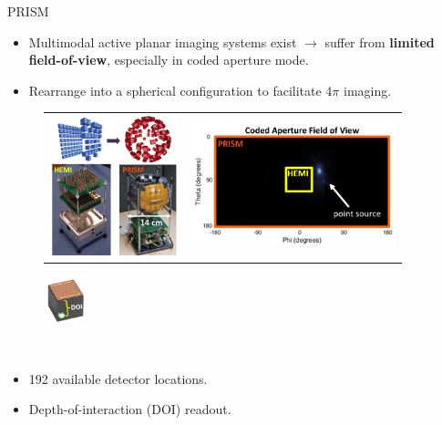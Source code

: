 \documentclass[xcolor=x11names,compress]{beamer}
\renewcommand{\(}{\begin{columns}}
\renewcommand{\)}{\end{columns}}
\newcommand{\<}[1]{\begin{column}{#1}}
\renewcommand{\>}{\end{column}}
\begin{document}
\begin{frame}{PRISM}

\begin{itemize}
\item Multimodal active planar imaging systems exist \cite{Galloway} $\rightarrow$ suffer from \textbf{limited field-of-view}, especially in coded aperture mode. 
\item Rearrange into a spherical configuration to facilitate 4$\pi$ imaging.
\end{itemize}

\vspace{-10pt}

\begin{figure}
\begin{tabular}{cc}
\includegraphics[height=1.6in]{Figures/HEMIvPRISM.png} &
\includegraphics[height=1.4in]{Figures/FOV.png}
\end{tabular}
\end{figure}

\vspace{-15pt}

\begin{figure}
\includegraphics[width=0.5in]{Figures/DOI.png} 
\end{figure}

\textcolor{white}{a}
\vspace{1pt}

\begin{itemize}
\item 192 available detector locations.
\item Depth-of-interaction (DOI) readout.
\end{itemize}

\end{frame}
\end{document}
